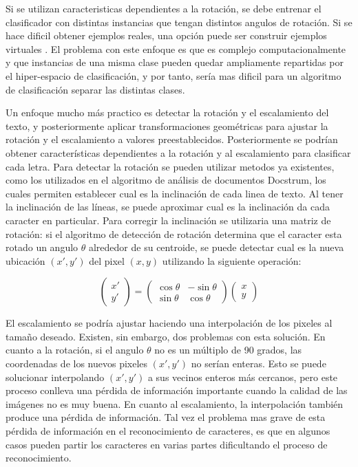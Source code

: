 \documentclass[a4paper, 11pt, oneside]{report}
\begin{document}
Si se utilizan caracteristicas dependientes a la rotación, se debe entrenar el clasificador con distintas instancias que tengan distintos angulos de rotación. Si se hace dificil obtener ejemplos reales, una opción puede ser construir ejemplos virtuales \cite{niyogi2002}. El problema con este enfoque es que es complejo computacionalmente y que instancias de una misma clase pueden quedar ampliamente repartidas por el hiper-espacio de clasificación, y por tanto, sería mas dificil para un algoritmo de clasificación separar las distintas clases.

Un enfoque mucho más practico es detectar la rotación y el escalamiento del texto, y posteriormente aplicar transformaciones geométricas para ajustar la rotación y el escalamiento a valores preestablecidos. Posteriormente se podrían obtener características dependientes a la rotación y al escalamiento para clasificar cada letra. Para detectar la rotación se pueden utilizar metodos ya existentes, como los utilizados en el algoritmo de análisis de documentos Docstrum, los cuales permiten establecer cual es la inclinación de cada linea de texto. Al tener la inclinación de las líneas, se puede aproximar cual es la inclinación da cada caracter en particular. Para corregir la inclinación se utilizaria una matriz de rotación: si el algoritmo de detección de rotación determina que el caracter esta rotado un angulo $\theta$ alrededor de su centroide, se puede detectar cual es la nueva ubicación $(x', y')$ del pixel $(x, y)$ utilizando la siguiente operación:

	\[
		\begin{pmatrix} 
			x' \\ y'
		\end{pmatrix}
		=
		\begin{pmatrix} 
			\cos\theta & -\sin\theta \\
			\sin\theta & \cos\theta
		\end{pmatrix}
		\begin{pmatrix} 
			x \\ y
		\end{pmatrix}
	\]

El escalamiento se podría ajustar haciendo una interpolación de los pixeles al tamaño deseado. Existen, sin embargo, dos problemas con esta solución. En cuanto a la rotación, si el angulo $\theta$ no es un múltiplo de 90 grados, las coordenadas de los nuevos pixeles $(x', y')$ no serían enteras. Esto se puede solucionar interpolando $(x',y')$ a sus vecinos enteros más cercanos, pero este proceso conlleva una pérdida de información importante cuando la calidad de las imágenes no es muy buena. En cuanto al escalamiento, la interpolación también produce una pérdida de información. Tal vez el problema mas grave de esta pérdida de información en el reconocimiento de caracteres, es que en algunos casos pueden partir los caracteres en varias partes dificultando el proceso de reconocimiento.
\end{document}
